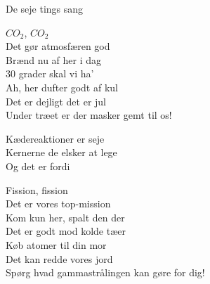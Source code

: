 \begin{song}{De seje tings sang}
  \begin{SBChorus}
    $CO_2$, $CO_2$\\
    Det gør atmosfæren god\\
    Brænd nu af her i dag\\
    30 grader skal vi ha'\\
    Ah, her dufter godt af kul\\
    Det er dejligt det er jul\\
    Under træet er der masker gemt til os!
  \end{SBChorus}

  \begin{SBVerse}
    Kædereaktioner er seje\\
    Kernerne de elsker at lege\\
    Og det er fordi
  \end{SBVerse}

  \begin{SBChorus}
    Fission, fission\\
    Det er vores top-mission\\
    Kom kun her, spalt den der\\
    Det er godt mod kolde tæer\\
    Køb atomer til din mor\\
    Det kan redde vores jord\\
    Spørg hvad gammastrålingen kan gøre for dig!
  \end{SBChorus}
\end{song}